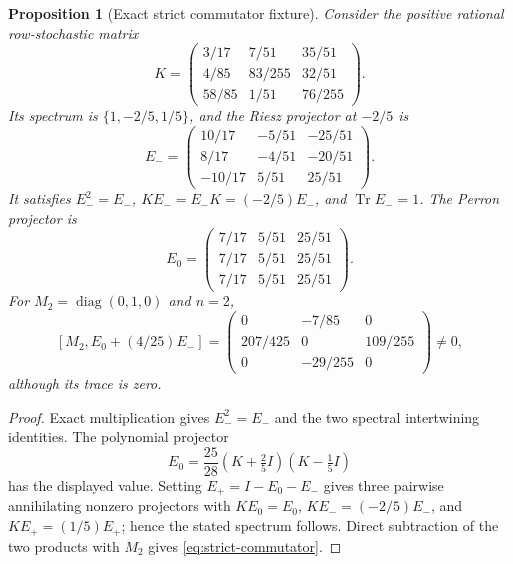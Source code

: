 \documentclass[11pt]{article}
\newtheorem{proposition}[theorem]{Proposition}
\theoremstyle{remark}
\newcommand{\Tr}{\operatorname{Tr}}
\begin{document}
\begin{proposition}[Exact strict commutator fixture]
\label{prop:commutator-fixture}
Consider the positive rational row-stochastic matrix
\begin{equation}\label{eq:K-fixture}
 K=\begin{pmatrix}
 3/17&7/51&35/51\\
 4/85&83/255&32/51\\
 58/85&1/51&76/255
 \end{pmatrix}.
\end{equation}
Its spectrum is $\{1,-2/5,1/5\}$, and the Riesz projector at $-2/5$ is
\begin{equation}\label{eq:Eminus-fixture}
 E_-=\begin{pmatrix}
 10/17&-5/51&-25/51\\
 8/17&-4/51&-20/51\\
 -10/17&5/51&25/51
 \end{pmatrix}.
\end{equation}
It satisfies $E_-^2=E_-$,
$KE_-=E_-K=(-2/5)E_-$, and $\Tr E_-=1$.
The Perron projector is
\begin{equation}\label{eq:Ezero-fixture}
 E_0=\begin{pmatrix}
 7/17&5/51&25/51\\
 7/17&5/51&25/51\\
 7/17&5/51&25/51
 \end{pmatrix}.
\end{equation}
For $M_2=\operatorname{diag}(0,1,0)$ and $n=2$,
\begin{equation}\label{eq:strict-commutator}
 [M_2,E_0+(4/25)E_-]
 =\begin{pmatrix}
 0&-7/85&0\\
 207/425&0&109/255\\
 0&-29/255&0
 \end{pmatrix}\ne0,
\end{equation}
although its trace is zero.
\end{proposition}

\begin{proof}
Exact multiplication gives
$E_-^2=E_-$ and the two spectral intertwining identities.  The polynomial
projector
\[
 E_0=\frac{25}{28}(K+\tfrac25I)(K-\tfrac15I)
\]
has the displayed value.  Setting $E_+=I-E_0-E_-$ gives three pairwise
annihilating nonzero projectors with
$KE_0=E_0$, $KE_-=(-2/5)E_-$, and $KE_+=(1/5)E_+$; hence the stated
spectrum follows.  Direct subtraction of the two products with $M_2$ gives
\eqref{eq:strict-commutator}.
\end{proof}
\end{document}
